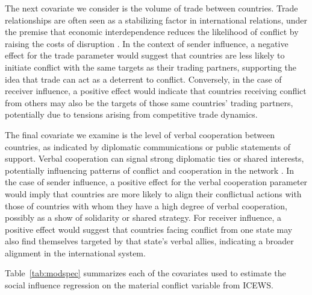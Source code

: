 The next covariate we consider is the volume of trade between countries. Trade relationships are often seen as a stabilizing factor in international relations, under the premise that economic interdependence reduces the likelihood of conflict by raising the costs of disruption \citep{keohane:nye:1977,oneal:russett:1999}. In the context of sender influence, a negative effect for the trade parameter would suggest that countries are less likely to initiate conflict with the same targets as their trading partners, supporting the idea that trade can act as a deterrent to conflict. Conversely, in the case of receiver influence, a positive effect would indicate that countries receiving conflict from others may also be the targets of those same countries' trading partners, potentially due to tensions arising from competitive trade dynamics.

The final covariate we examine is the level of verbal cooperation between countries, as indicated by diplomatic communications or public statements of support. Verbal cooperation can signal strong diplomatic ties or shared interests, potentially influencing patterns of conflict and cooperation in the network \citep{dorussen:ward:2008}. In the case of sender influence, a positive effect for the verbal cooperation parameter would imply that countries are more likely to align their conflictual actions with those of countries with whom they have a high degree of verbal cooperation, possibly as a show of solidarity or shared strategy. For receiver influence, a positive effect would suggest that countries facing conflict from one state may also find themselves targeted by that state's verbal allies, indicating a broader alignment in the international system.

Table~\ref{tab:modspec} summarizes each of the covariates used to estimate the social influence regression on the material conflict variable from ICEWS.

